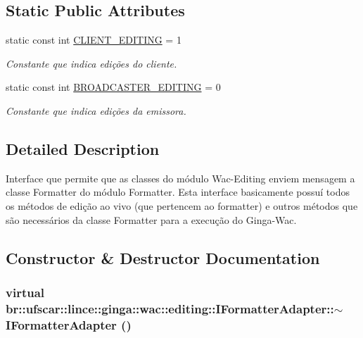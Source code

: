 \subsection*{Static Public Attributes}
\begin{DoxyCompactItemize}
\item 
static const int \hyperlink{classbr_1_1ufscar_1_1lince_1_1ginga_1_1wac_1_1editing_1_1IFormatterAdapter_a48e3735d7a1ade76f2f741592b5b097e}{CLIENT\_\-EDITING} = 1
\begin{DoxyCompactList}\small\item\em Constante que indica edições do cliente. \item\end{DoxyCompactList}\item 
static const int \hyperlink{classbr_1_1ufscar_1_1lince_1_1ginga_1_1wac_1_1editing_1_1IFormatterAdapter_a60586f9a11e5cefcfecef9386c28d4bd}{BROADCASTER\_\-EDITING} = 0
\begin{DoxyCompactList}\small\item\em Constante que indica edições da emissora. \item\end{DoxyCompactList}\end{DoxyCompactItemize}


\subsection{Detailed Description}
Interface que permite que as classes do módulo Wac-\/Editing enviem mensagem a classe Formatter do módulo Formatter. Esta interface basicamente possuí todos os métodos de edição ao vivo (que pertencem ao formatter) e outros métodos que são necessários da classe Formatter para a execução do Ginga-\/Wac. 

\subsection{Constructor \& Destructor Documentation}
\hypertarget{classbr_1_1ufscar_1_1lince_1_1ginga_1_1wac_1_1editing_1_1IFormatterAdapter_aa2e061e9d4bd5af9ee7abc5354d4f1a7}{
\subsubsection[{$\sim$IFormatterAdapter}]{\setlength{\rightskip}{0pt plus 5cm}virtual br::ufscar::lince::ginga::wac::editing::IFormatterAdapter::$\sim$IFormatterAdapter ()}}
\label{classbr_1_1ufscar_1_1lince_1_1ginga_1_1wac_1_1editing_1_1IFormatterAdapter_aa2e061e9d4bd5af9ee7abc5354d4f1a7}



